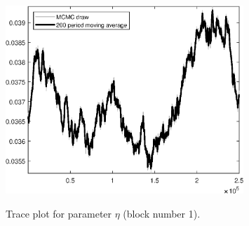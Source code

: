 \begin{figure}[H]
\centering
  \includegraphics[width=0.8\textwidth]{BRS_imp_mobility/graphs/TracePlot_eta_blck_1}\\
    \caption{Trace plot for parameter ${\eta}$ (block number 1).}
\end{figure}
